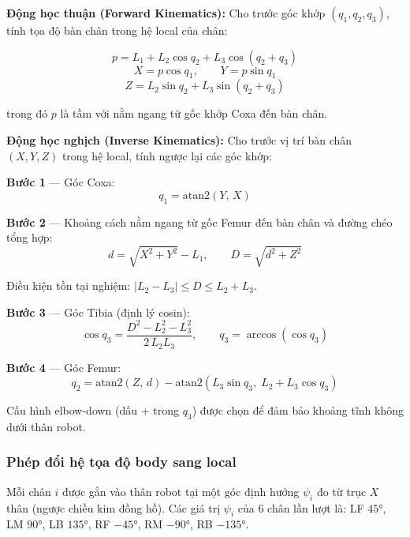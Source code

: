 \textbf{Động học thuận (Forward Kinematics):} Cho trước góc khớp $(q_1, q_2, q_3)$, tính tọa độ bàn chân trong hệ local của chân:

\begin{equation}
    p = L_1 + L_2 \cos q_2 + L_3 \cos(q_2 + q_3)
\end{equation}
\begin{equation}
    X = p \cos q_1, \qquad Y = p \sin q_1
\end{equation}
\begin{equation}
    Z = L_2 \sin q_2 + L_3 \sin(q_2 + q_3)
\end{equation}

trong đó $p$ là tầm với nằm ngang từ gốc khớp Coxa đến bàn chân.

\textbf{Động học nghịch (Inverse Kinematics):} Cho trước vị trí bàn chân $(X, Y, Z)$ trong hệ local, tính ngược lại các góc khớp:

\textbf{Bước 1} — Góc Coxa:
\begin{equation}
    q_1 = \mathrm{atan2}(Y,\, X)
\end{equation}

\textbf{Bước 2} — Khoảng cách nằm ngang từ gốc Femur đến bàn chân và đường chéo tổng hợp:
\begin{equation}
    d = \sqrt{X^2 + Y^2} - L_1, \qquad D = \sqrt{d^2 + Z^2}
\end{equation}

Điều kiện tồn tại nghiệm: $|L_2 - L_3| \leq D \leq L_2 + L_3$.

\textbf{Bước 3} — Góc Tibia (định lý cosin):
\begin{equation}
    \cos q_3 = \frac{D^2 - L_2^2 - L_3^2}{2\,L_2 L_3}, \qquad q_3 = \arccos(\cos q_3)
\end{equation}

\textbf{Bước 4} — Góc Femur:
\begin{equation}
    q_2 = \mathrm{atan2}(Z,\, d) - \mathrm{atan2}\!\left(L_3 \sin q_3,\; L_2 + L_3 \cos q_3\right)
\end{equation}

Cấu hình elbow-down (dấu $+$ trong $q_3$) được chọn để đảm bảo khoảng tĩnh không dưới thân robot.


\subsubsection{Phép đổi hệ tọa độ body sang local}

\hspace{0.5cm} Mỗi chân $i$ được gắn vào thân robot tại một góc định hướng $\psi_i$ đo từ trục $X$ thân (ngược chiều kim đồng hồ). Các giá trị $\psi_i$ của 6 chân lần lượt là: LF $45°$, LM $90°$, LB $135°$, RF $-45°$, RM $-90°$, RB $-135°$.

